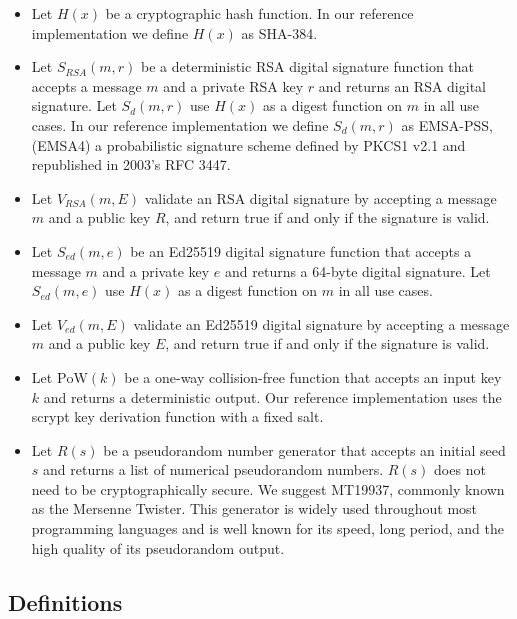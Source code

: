 \documentclass{sig-alternate}
\begin{document}
\begin{itemize}[noitemsep,nolistsep]
	\item Let $ H(x) $ be a cryptographic hash function. In our reference implementation we define $ H(x) $ as SHA-384.
	\item Let $ S_{\mathit{RSA}}(m, r) $ be a deterministic RSA digital signature function that accepts a message $ m $ and a private RSA key $ r $ and returns an RSA digital signature. Let $ S_{d}(m, r) $ use $ H(x) $ as a digest function on $ m $ in all use cases. In our reference implementation we define $ S_{d}(m, r) $ as EMSA-PSS, (EMSA4) a probabilistic signature scheme defined by PKCS1 v2.1 and republished in 2003's RFC 3447.
	\item Let $ V_{\mathit{RSA}}(m, E) $ validate an RSA digital signature by accepting a message $ m $ and a public key $ R $, and return true if and only if the signature is valid.
	\item Let $ S_{\mathit{ed}}(m, e) $ be an Ed25519 digital signature function that accepts a message $ m $ and a private key $ e $ and returns a 64-byte digital signature. Let $ S_{\mathit{ed}}(m, e) $ use $ H(x) $ as a digest function on $ m $ in all use cases.
	\item Let $ V_{\mathit{ed}}(m, E) $ validate an Ed25519 digital signature by accepting a message $ m $ and a public key $ E $, and return true if and only if the signature is valid.
	\item Let $ \mathrm{PoW}(k) $ be a one-way collision-free function that accepts an input key $ k $ and returns a deterministic output. Our reference implementation uses the scrypt key derivation function with a fixed salt.
	\item Let $ \mathit{R}(s) $ be a pseudorandom number generator that accepts an initial seed $ s $ and returns a list of numerical pseudorandom numbers. $ \mathit{R}(s) $ does not need to be cryptographically secure. We suggest MT19937, commonly known as the Mersenne Twister. This generator is widely used throughout most programming languages and is well known for its speed, long period, and the high quality of its pseudorandom output.\cite{matsumoto1998mersenne}
\end{itemize}

 \subsection{Definitions} %
\end{document}
